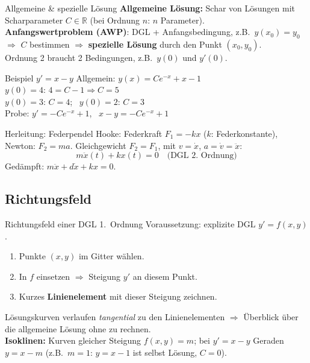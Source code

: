\documentclass[a4paper, fontsize=7pt]{scrartcl}
\def\R{\mathbb{R}}  %
\begin{document}
\begin{mainbox}{Allgemeine \& spezielle Lösung}
\textbf{Allgemeine Lösung:} Schar von Lösungen mit Scharparameter
$C \in \R$ (bei Ordnung $n$: $n$ Parameter).\\
\textbf{Anfangswertproblem (AWP)}: DGL + Anfangsbedingung, z.B.\
$y(x_0) = y_0$ $\Rightarrow$ $C$ bestimmen $\Rightarrow$
\textbf{spezielle Lösung} durch den Punkt $(x_0, y_0)$.\\
Ordnung 2 braucht 2 Bedingungen, z.B.\ $y(0)$ und $y'(0)$.
\end{mainbox}

\begin{subbox}{Beispiel $y' = x - y$}
Allgemein: $y(x) = Ce^{-x} + x - 1$\\
$y(0) = 4$: $4 = C - 1 \Rightarrow C = 5$\\
$y(0) = 3$: $C = 4$; \ $y(0) = 2$: $C = 3$\\
Probe: $y' = -Ce^{-x} + 1$, \ $x - y = -Ce^{-x} + 1$ \checkmark
\end{subbox}

\begin{subbox}{Herleitung: Federpendel}
Hooke: Federkraft $F_1 = -kx$ ($k$: Federkonstante), Newton:
$F_2 = ma$. Gleichgewicht $F_2 = F_1$, mit $v = \dot{x}$,
$a = \dot{v} = \ddot{x}$:
$$\boxed{m\ddot{x}(t) + kx(t) = 0} \quad \text{(DGL 2.\ Ordnung)}$$
Gedämpft: $m\ddot{x} + d\dot{x} + kx = 0$.
\end{subbox}

\subsection{Richtungsfeld}

\begin{mainbox}{Richtungsfeld einer DGL 1.\ Ordnung}
Voraussetzung: explizite DGL $y' = f(x, y)$.
\begin{enumerate}
    \item Punkte $(x, y)$ im Gitter wählen.
    \item In $f$ einsetzen $\Rightarrow$ Steigung $y'$ an diesem Punkt.
    \item Kurzes \textbf{Linienelement} mit dieser Steigung zeichnen.
\end{enumerate}
Lösungskurven verlaufen \emph{tangential} zu den Linienelementen
$\Rightarrow$ Überblick über die allgemeine Lösung ohne zu rechnen.\\
\textbf{Isoklinen:} Kurven gleicher Steigung $f(x, y) = m$; bei
$y' = x - y$ Geraden $y = x - m$ (z.B.\ $m = 1$: $y = x - 1$ ist
selbst Lösung, $C = 0$).
\end{mainbox}
\end{document}
